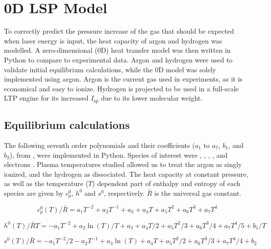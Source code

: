\chapter{0D LSP Model} \label{chp:models}

    To correctly predict the pressure increase of the gas that should be expected when laser energy is input, the heat capacity of argon and hydrogen was modelled. A zero-dimensional (0D) heat transfer model was then written in Python to compare to experimental data. Argon and hydrogen were used to validate initial equilibrium calculations, while the 0D model was solely implemented using argon. Argon is the current gas used in experiments, as it is economical and easy to ionize. Hydrogen is projected to be used in a full-scale LTP engine for its increased $I_\mathrm{sp}$ due to its lower molecular weight.

    \section{Equilibrium calculations} \label{sec:equilibrium calcs}
        
        The following seventh order polynomials and their coefficients ($a_1$ to $a_7$, $b_1$, and $b_2$), from \textcite{mcbrideNASAGlennCoefficients2002}, were implemented in Python. Species of interest were , , , , and electrons . Plasma temperatures studied allowed us to treat the argon as singly ionized, and the hydrogen as dissociated. The heat capacity at constant pressure, as well as the temperature ($T$) dependent part of enthalpy and entropy of each species are given by $c_p^0$, $h^0$ and $s^0$, respectively. $\bar R$ is the universal gas constant.

        \begin{equation}
            c_p^0 (T)/\bar R = a_1 T^{-2} + a_2 T^{-1} + a_3 + a_4   T + a_5 T^2 + a_6 T^3 + a_7 T^4
        \end{equation} 
        
        \begin{equation}
            h^0 (T)/\bar RT = -a_1 T^{-2} + a_2 \ln(T)/T + a_3 + a_4 T / 2 + a_5 {T^2}/3 + a_6 {T^3}/4 + a_7 {T^4}/5 + b_1/T
        \end{equation}
        
        \begin{equation}
            s^0(T)/\bar R = -a_1 T^{-2}/2 - a_2 T^{-1} + a_3\ln(T) + a_4   T + a_5 {T^2}/2 + a_6 T^3/3 + a_7 T^4/4 + b_2
        \end{equation}

